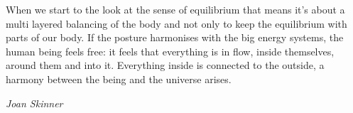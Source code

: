 \documentclass[../main.tex]{subfiles}
\begin{document}
        \setlength\epigraphwidth{\textwidth}
        
        \epigraph{When we start to the look at the sense of equilibrium that means it's about a multi layered balancing of the body and not only to keep the equilibrium with parts of our body.
          If the posture harmonises with the big energy systems, the human being feels free: it feels that everything is in flow, inside themselves, around them and into it.
          Everything inside is connected to the outside, a harmony between the being and the universe arises.}{\textit{Joan Skinner}}
        \setlength{}
\end{document}
